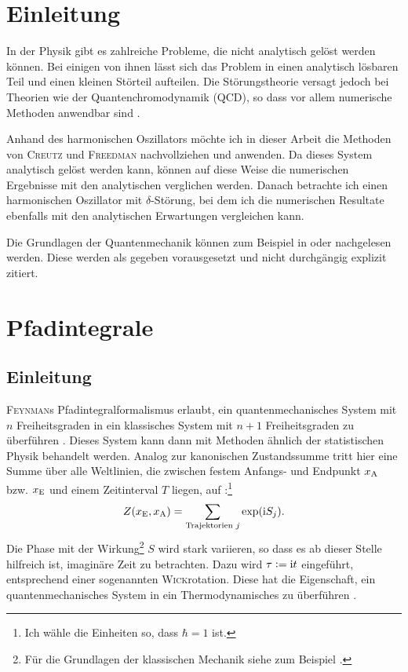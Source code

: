
\chapter{Einleitung}

In der Physik gibt es zahlreiche Probleme, die nicht analytisch gelöst werden
können. Bei einigen von ihnen lässt sich das Problem in einen analytisch
lösbaren Teil und einen kleinen Störteil aufteilen. Die Störungstheorie versagt
jedoch bei Theorien wie der Quantenchromodynamik (QCD), so dass vor allem
numerische Methoden anwendbar sind \parencite{Wittig/Farbdynamik_Gitter}.

Anhand des harmonischen Oszillators möchte ich in dieser Arbeit die Methoden
von \textsc{Creutz} und \textsc{Freedman} nachvollziehen und anwenden. Da
dieses System analytisch gelöst werden kann, können auf diese Weise die
numerischen Ergebnisse mit den analytischen verglichen werden. Danach betrachte
ich einen harmonischen Oszillator mit $\delta$-Störung, bei dem ich die
numerischen Resultate ebenfalls mit den analytischen Erwartungen vergleichen
kann.

Die Grundlagen der Quantenmechanik können zum Beispiel in
\parencite{Schwabl/Quantenmechanik} oder \parencite{nolting-theo5} nachgelesen
werden. Diese werden als gegeben vorausgesetzt und nicht durchgängig explizit
zitiert.

\chapter{Pfadintegrale}

\section{Einleitung}

\textsc{Feynman}s Pfadintegralformalismus erlaubt, ein quantenmechanisches
System mit $n$ Freiheitsgraden in ein klassisches System mit $n+1$
Freiheitsgraden zu überführen
\parencite[§12.4]{Thijssen/Computational_Physics}. Dieses System kann dann mit
Methoden ähnlich der statistischen Physik behandelt werden. Analog zur
kanonischen Zustandssumme tritt hier eine Summe über alle Weltlinien, die
zwischen festem Anfangs- und Endpunkt $x_\text A$ bzw. $x_\text E$ und einem
Zeitinterval $T$ liegen, auf
\parencite[(2.7)]{Creutz/Statistical_Approach_QM}:\footnote {Ich wähle die
Einheiten so, dass $\hbar = 1$ ist.}
\[
    Z(x_\text E, x_\text A) = \sum_{\text{Trajektorien $j$}} \exp(\mathrm i S_j).
\]
Die Phase mit der Wirkung\footnote{Für die Grundlagen der klassischen Mechanik
siehe zum Beispiel \parencite{Kuypers/Mechanik}.} $S$ wird stark variieren, so
dass es ab dieser Stelle hilfreich ist, imaginäre Zeit zu betrachten. Dazu wird
$\tau := \mathrm i t$ eingeführt, entsprechend einer sogenannten
\textsc{Wick}rotation. Diese hat die Eigenschaft, ein quantenmechanisches
System in ein Thermodynamisches zu überführen \parencite[24]{Stetz/AQT}.

